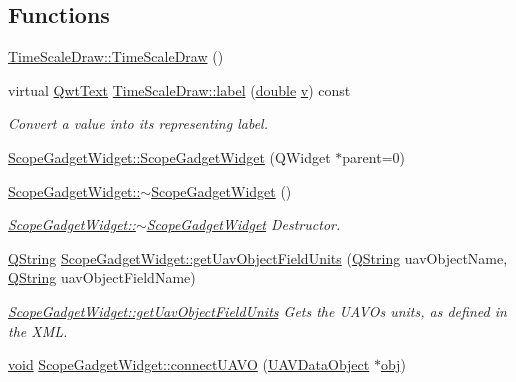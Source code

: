 \subsection*{Functions}
\begin{DoxyCompactItemize}
\item 
\hyperlink{group__scopeplugin_ga84399225e78ebb91c66163a637662f2a}{Time\-Scale\-Draw\-::\-Time\-Scale\-Draw} ()
\item 
virtual \hyperlink{class_qwt_text}{Qwt\-Text} \hyperlink{group__scopeplugin_gadd46f1edfb468453018c231b7a1e92f2}{Time\-Scale\-Draw\-::label} (\hyperlink{_super_l_u_support_8h_a8956b2b9f49bf918deed98379d159ca7}{double} \hyperlink{glext_8h_a14cfbe2fc2234f5504618905b69d1e06}{v}) const 
\begin{DoxyCompactList}\small\item\em Convert a value into its representing label. \end{DoxyCompactList}\item 
\hyperlink{group__scopeplugin_ga2810fbb794c4531b885259a5100bcf79}{Scope\-Gadget\-Widget\-::\-Scope\-Gadget\-Widget} (Q\-Widget $\ast$parent=0)
\item 
\hyperlink{group__scopeplugin_gaa4f8465d4475c6035056db0bb194b9fa}{Scope\-Gadget\-Widget\-::$\sim$\-Scope\-Gadget\-Widget} ()
\begin{DoxyCompactList}\small\item\em \hyperlink{group__scopeplugin_gaa4f8465d4475c6035056db0bb194b9fa}{Scope\-Gadget\-Widget\-::$\sim$\-Scope\-Gadget\-Widget} Destructor. \end{DoxyCompactList}\item 
\hyperlink{group___u_a_v_objects_plugin_gab9d252f49c333c94a72f97ce3105a32d}{Q\-String} \hyperlink{group__scopeplugin_ga4fc130c09e788ead2fe9da284efb780b}{Scope\-Gadget\-Widget\-::get\-Uav\-Object\-Field\-Units} (\hyperlink{group___u_a_v_objects_plugin_gab9d252f49c333c94a72f97ce3105a32d}{Q\-String} uav\-Object\-Name, \hyperlink{group___u_a_v_objects_plugin_gab9d252f49c333c94a72f97ce3105a32d}{Q\-String} uav\-Object\-Field\-Name)
\begin{DoxyCompactList}\small\item\em \hyperlink{group__scopeplugin_ga4fc130c09e788ead2fe9da284efb780b}{Scope\-Gadget\-Widget\-::get\-Uav\-Object\-Field\-Units} Gets the U\-A\-V\-Os units, as defined in the X\-M\-L. \end{DoxyCompactList}\item 
\hyperlink{group___u_a_v_objects_plugin_ga444cf2ff3f0ecbe028adce838d373f5c}{void} \hyperlink{group__scopeplugin_gae48ddd25c6bea599893a60ab02c375bf}{Scope\-Gadget\-Widget\-::connect\-U\-A\-V\-O} (\hyperlink{class_u_a_v_data_object}{U\-A\-V\-Data\-Object} $\ast$\hyperlink{glext_8h_a0c0d4701a6c89f4f7f0640715d27ab26}{obj})

\end{DoxyCompactItemize}
